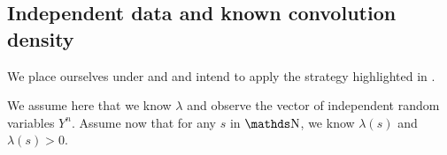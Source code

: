 %                                                                 
% 
%
\subsection{Independent data and known convolution density}\label{FREQ_DECONV_KNOWN}\label{ak:rb}\label{AK:RB}
\begin{te}
We place ourselves under  and  and intend to apply the strategy highlighted in .
\end{te}

We assume here that we know $\lambda$ and observe the vector of independent random variables $Y^{n}$.
Assume now that for any $s$ in $\N$, we know $\lambda(s)$ and $\lambda(s) > 0$.
